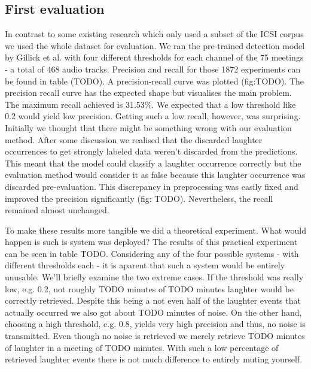 \documentclass[bsc,frontabs,parskip,deptreport]{infthesis}
\begin{document}
\subsection{First evaluation}
In contrast to some existing research \citep{kennedy2004laughter, knox2006automatic} which only used a subset of the ICSI corpus we used the whole dataset for evaluation. We ran the pre-trained detection model by Gillick et al. with four different thresholds for each channel of the 75 meetings - a total of 468 audio tracks. 
Precision and recall for those 1872 experiments can be found in table (TODO).
A precision-recall curve was plotted (fig:TODO). The precision recall curve has the expected shape but visualises the main problem. The maximum recall achieved is 31.53\%. We expected that a low threshold like 0.2 would yield low precision. Getting such a low recall, however, was surprising. 
Initially we thought that there might be something wrong with our evaluation method. After some discussion we realised that the discarded laughter occurrences to get strongly labeled data weren't discarded from the predictions. This meant that the model could classify a laughter occurrence correctly but the evaluation method would consider it as false because this laughter occurrence was discarded pre-evaluation. This discrepancy in preprocessing was easily fixed and improved the precision significantly (fig: TODO). Nevertheless, the recall remained almost unchanged. 

To make these results more tangible we did a theoretical experiment. What would happen is such is system was deployed? The results of this practical experiment can be seen in table TODO. 
Considering any of the four possible systems - with different thresholds each - it is aparent that such a system would be entirely unusable. We'll briefly examine the two extreme cases. If the threshold was really low, e.g. 0.2, not roughly TODO minutes of TODO minutes laughter would be correctly retrieved. Despite this being a not even half of the laughter events that actually occurred we also got about TODO minutes of noise.  
On the other hand, choosing a high threshold, e.g. 0.8, yields very high precision and thus, no noise is transmitted. Even though no noise is retrieved we merely retrieve TODO minutes of laughter in a meeting of TODO minutes. With such a low percentage of retrieved laughter events there is not much difference to entirely muting yourself. 
\end{document}
